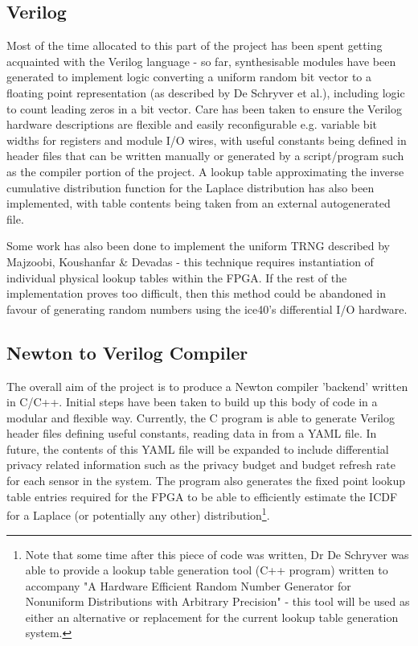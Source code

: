 \documentclass[pageno]{jpaper}
\begin{document}
\subsection{Verilog}
Most of the time allocated to this part of the project has been spent getting acquainted with the Verilog language - so far, synthesisable modules have been generated to implement logic converting a uniform random bit vector to a floating point representation (as described by De Schryver et al.\cite{DeSchryver}), including logic to count leading zeros in a bit vector. Care has been taken to ensure the Verilog hardware descriptions are flexible and easily reconfigurable e.g. variable bit widths for registers and module I/O wires, with useful constants being defined in header files that can be written manually or generated by a script/program such as the compiler portion of the project. A lookup table approximating the inverse cumulative distribution function for the Laplace distribution has also been implemented, with table contents being taken from an external autogenerated file.

Some work has also been done to implement the uniform TRNG described by Majzoobi, Koushanfar \& Devadas\cite{trng} - this technique requires instantiation of individual physical lookup tables within the FPGA. If the rest of the implementation proves too difficult, then this method could be abandoned in favour of generating random numbers using the ice40's differential I/O hardware.

\subsection{Newton to Verilog Compiler}
The overall aim of the project is to produce a Newton compiler 'backend' written in C/C++. Initial steps have been taken to build up this body of code in a modular and flexible way. Currently, the C program is able to generate Verilog header files defining useful constants, reading data in from a YAML file. In future, the contents of this YAML file will be expanded to include differential privacy related information such as the privacy budget and budget refresh rate for each sensor in the system. The program also generates the fixed point lookup table entries required for the FPGA to be able to efficiently estimate the ICDF for a Laplace (or potentially any other) distribution\footnote{Note that some time after this piece of code was written, Dr De Schryver was able to provide a lookup table generation tool (C++ program) written to accompany "A Hardware Efficient Random Number Generator for Nonuniform Distributions with Arbitrary Precision"\cite{DeSchryver} - this tool will be used as either an alternative or replacement for the current lookup table generation system.}.
\end{document}
